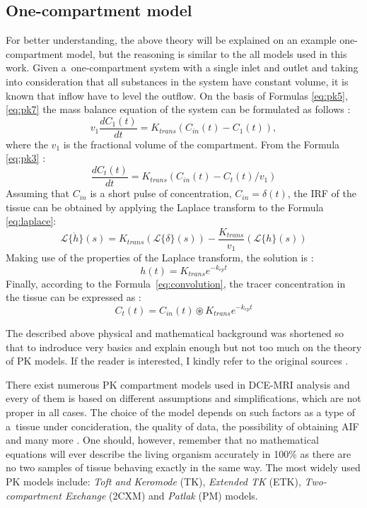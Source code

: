 \subsection{One-compartment model}
For better understanding, the above theory will be explained on an example one-compartment model, but the reasoning is similar to the all models used in this work. Given a~one-compartment system with a single inlet and outlet and taking into consideration that all substances in the system have constant volume, it is known that inflow have to level the outflow. On the basis of Formulas \ref{eq:pk5}, \ref{eq:pk7} the mass balance equation of the system can be formulated as follows \cite{thesis}:
\begin{equation}
v_1\frac{dC_1(t)}{dt} = K_{trans}(C_{in}(t)-C_1(t)),
\end{equation}
where the $v_1$ is the fractional volume of the compartment. From the Formula \ref{eq:pk3} \cite{thesis}:
\begin{equation}
\frac{dC_t(t)}{dt} = K_{trans}(C_{in}(t)-C_t(t)/v_1)
\label{eq:laplace}
\end{equation}
Assuming that $C_{in}$ is a short pulse of concentration, $C_{in}=\delta(t)$, the IRF of the tissue can be obtained by applying the Laplace transform to the Formula \ref{eq:laplace}: 
\begin{equation}
\mathcal{L}\{\dot{h}\}(s) = K_{trans}(\mathcal{L}\{\delta\}(s)) - \frac{K_{trans}}{v_1}(\mathcal{L}\{h\}(s))
\end{equation}
Making use of the properties of the Laplace transform, the solution is \cite{thesis}:
\begin{equation}
h(t) = K_{trans}e^{-k_{ep}t}
\end{equation}
Finally, according to the Formula~\ref{eq:convolution}, the tracer concentration in the tissue can be expressed as \cite{thesis}:
\begin{equation}
	C_{t}(t) = C_{in}(t)\circledast  K_{trans}e^{-k_{ep}t} 
\end{equation}


The described above physical and mathematical background was shortened so that to indroduce very basics and explain enough but not too much on the theory of PK models. If the reader is interested, I kindly refer to the original sources \cite{sourbron2011scope, thesis}. 

There exist numerous PK compartment models used in DCE-MRI analysis and every of them is based on different assumptions and simplifications, which are not proper in all cases. The choice of the model depends on such factors as a type of a~tissue under concideration, the quality of data, the possibility of obtaining AIF and many more \cite{khalifa2014models}. One should, however, remember that no mathematical equations will ever describe the living organism accurately in 100\% as there are no two samples of tissue behaving exactly in the same way. The most widely used PK models include: \textit{Toft and Keromode} (TK), \textit{Extended TK} (ETK), \textit{Two-compartment Exchange} (2CXM) and \textit{Patlak} (PM) models.  

